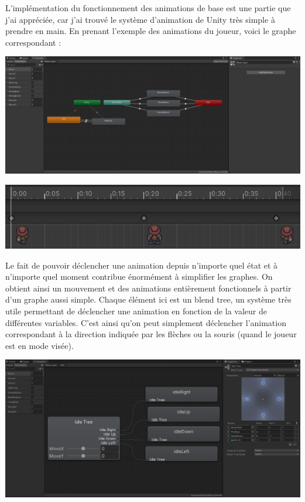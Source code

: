 \documentclass[a4page, 14pt]{extarticle}
\begin{document}
{        
        L'implémentation du fonctionnement des animations de base est une partie que j'ai appréciée, car j'ai trouvé le système d'animation de Unity très simple à prendre en main.
        En prenant l'exemple des animations du joueur, voici le graphe correspondant :
    \begin{center}
        \includegraphics[width=1\textwidth]{images/Animator-Graph.png}
    \end{center}
    \begin{center}
        \includegraphics[width=1\textwidth]{images/Animationex.png}
    \end{center}
Le fait de pouvoir déclencher une animation depuis n'importe quel état et à n'importe quel moment contribue énormément à simplifier les graphes. On obtient ainsi un mouvement et des animations entièrement fonctionnels à partir d'un graphe aussi simple. Chaque élément ici est un blend tree, un système très utile permettant de déclencher une animation en fonction de la valeur de différentes variables. C'est ainsi qu'on peut simplement déclencher l'animation correspondant à la direction indiquée par les flèches ou la souris (quand le joueur est en mode visée).
    \begin{center}
        \includegraphics[width=1\textwidth]{images/BlendTree-Example.png}

\end{center}}
\end{document}
